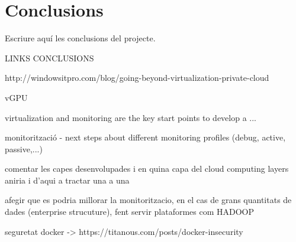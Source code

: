 \cleardoublepage
{}
\chapter*{Conclusions}\label{C:conclusions}

Escriure aquí les conclusions del projecte. 

LINKS CONCLUSIONS

http://windowsitpro.com/blog/going-beyond-virtualization-private-cloud

vGPU

virtualization and monitoring are the key start points to develop a ...

monitorització - next steps about different monitoring profiles (debug, active, passive,...)

comentar les capes desenvolupades i en quina capa del cloud computing layers aniria i d'aqui a tractar una a una

afegir que es podria millorar la monitoritzacio, en el cas de grans quantitats de dades (enterprise strucuture), fent servir plataformes com HADOOP

seguretat docker -> https://titanous.com/posts/docker-insecurity